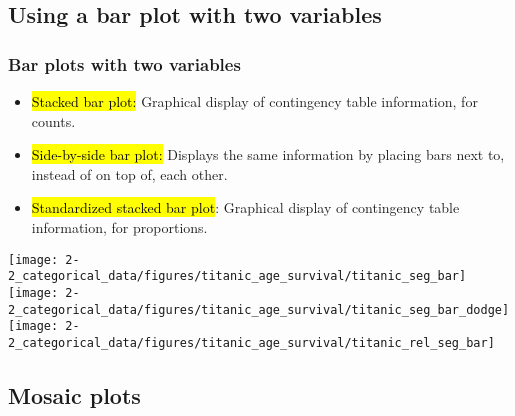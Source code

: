 {{\begin{frame}
\begin{itemize}
\end{itemize}

\end{frame}


\subsection{Using a bar plot with two variables}


\begin{frame}
\frametitle{Bar plots with two variables}

\begin{itemize}

\item \hl{Stacked bar plot:} Graphical display of contingency table information,
for counts.

\item \hl{Side-by-side bar plot:} Displays the same information by placing bars 
next to, instead of on top of, each other.

\item \hl{Standardized stacked bar plot}: Graphical display of contingency table 
information, for proportions.

\end{itemize}

\end{frame}


\begin{frame}


\begin{center}
\texttt{[image: 2-2\_categorical\_data/figures/titanic\_age\_survival/titanic\_seg\_bar]}
\texttt{[image: 2-2\_categorical\_data/figures/titanic\_age\_survival/titanic\_seg\_bar\_dodge]} \\
\texttt{[image: 2-2\_categorical\_data/figures/titanic\_age\_survival/titanic\_rel\_seg\_bar]}
\end{center}

\end{frame}


\subsection{Mosaic plots}

}}
